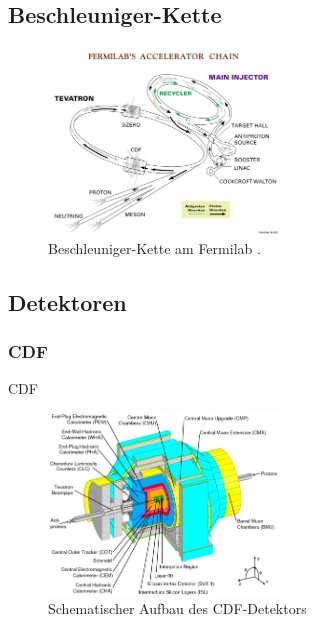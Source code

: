 \documentclass[aspectratio=1610, 9pt]{beamer}
\begin{document}
\subsection{Beschleuniger-Kette}

\begin{frame}
  \begin{figure}
    \includegraphics[width=0.55\textwidth]{images/accelerator_chain.jpg}
    \caption{Beschleuniger-Kette am Fermilab \cite{accelerator_chain}.}
  \end{figure}
\end{frame}

\subsection{Detektoren}

\subsubsection{CDF}

\begin{frame}{CDF}
    \begin{figure}
      \includegraphics[width=0.55\textwidth]{images/CDF.png}
      \caption{Schematischer Aufbau des CDF-Detektors \cite{CDF_aufbau}}
    \end{figure}
\end{frame}
\end{document}
